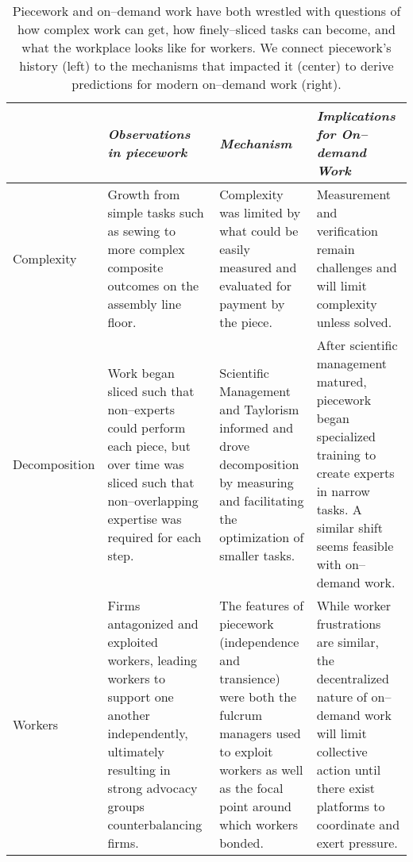 \documentclass[trackingWork]{subfiles}
\begin{document}
\begin{table*}[t]
  \centering
  \begin{tabularx}{\textwidth}{l X X X}
    \toprule
    & \textit{Observations in piecework} & \textit{Mechanism} & \textit{Implications for On--demand Work} \\
    \midrule
    {Complexity} &
    \small{Growth from simple tasks such as sewing to more complex composite outcomes on the assembly line floor.} &
    \small{Complexity was limited by what could be easily measured and evaluated for payment by the piece.} &
    \small{Measurement and verification remain challenges and will limit complexity unless solved.} \\ \hline

    {Decomposition} &
    \small{Work began sliced such that non--experts could perform each piece, but over time was sliced such that non--overlapping expertise was required for each step.} &
    \small{Scientific Management and Taylorism informed and drove decomposition by measuring and facilitating the optimization of smaller tasks.} &
    \small{After scientific management matured, piecework began  specialized training to create experts in narrow tasks. A similar shift seems feasible with on--demand work.} \\ \hline

    {Workers} &
    \small{Firms antagonized and exploited workers, leading workers to support one another independently, ultimately resulting in strong advocacy groups counterbalancing firms.} &
    \small{The features of piecework (independence and transience) were both the fulcrum managers used to exploit workers as well as the focal point around which workers bonded.} &
    \small{While worker frustrations are similar, the decentralized nature of on--demand work will limit collective action until there exist platforms to coordinate and exert pressure.} \\ 
    \bottomrule
  \end{tabularx}
  \caption{Piecework and on--demand work have both wrestled with questions of how complex work can get, how finely--sliced tasks can become, and what the workplace looks like for workers. We connect piecework's history (left) to the mechanisms that impacted it (center) to derive predictions for modern on--demand work (right). }
\end{table*}
\end{document}
